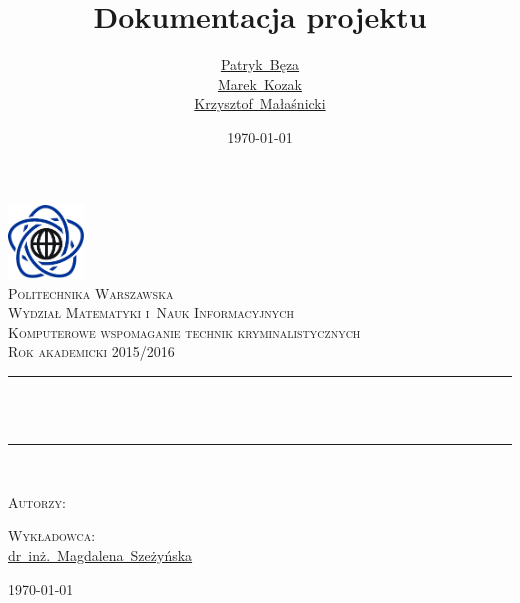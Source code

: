 \documentclass[a4paper,titlepage]{article}
\title{Dokumentacja projektu}
\author{
    \href{mailto:bezap@student.mini.pw.edu.pl}{Patryk~Bęza}\\[0.7em]
    \href{mailto:kozakm@student.mini.pw.edu.pl}{Marek~Kozak}\\[0.7em]
    \href{mailto:malasnickik@student.mini.pw.edu.pl}{Krzysztof~Małaśnicki}\\[0.7em]
}
\date{\today}
\theoremstyle{break}
\begin{document}
\makeatletter
\renewcommand{\ALG@name}{Algorytm}
\begin{titlepage}
\newcommand{\HRule}{\rule{\linewidth}{0.5mm}}
\center

\includegraphics[width=2.0cm]{img/mini}\\[1.5cm]
\textsc{\LARGE Politechnika Warszawska}\\[0.3cm]
\textsc{\Large Wydział Matematyki i~Nauk Informacyjnych}\\[1.5cm]
\textsc{\large Komputerowe wspomaganie technik kryminalistycznych}\\[0.2cm]
\textsc{\small Rok akademicki 2015/2016}\\[1.5cm]

\HRule \\[1cm]
{ \huge \bfseries \@title}\\[0.7cm]
\HRule \\[1.75cm]

\begin{minipage}[t]{0.4\textwidth}
\begin{flushleft}\large
\textsc{Autorzy:}\\[3mm]
\@author
\end{flushleft}
\end{minipage}
\begin{minipage}[t]{0.4\textwidth}
\begin{flushright}\large
\textsc{Wykładowca:}\\[3mm]
\href{mailto:m.szezynska@ise.pw.edu.pl}{dr~inż.~Magdalena~Szeżyńska}\\[1cm]
\end{flushright}
\end{minipage}
\vfill
{\large \today}

\end{titlepage}

\tableofcontents
\clearpage

\end{document}
